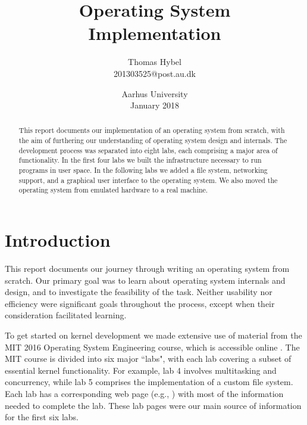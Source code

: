 \documentclass{report}
\begin{document}


\title{Operating System \\ Implementation}
\author{Thomas Hybel \\ \small{201303525@post.au.dk}}
\date{Aarhus University \\ January 2018}
\maketitle


\begin{abstract} 
\noindent 
This report documents our implementation of an operating system from scratch,
with the aim of furthering our understanding of operating system design and
internals. The development process was separated into eight labs, each
comprising a major area of functionality. In the first four labs we built the
infrastructure necessary to run programs in user space. In the following labs
we added a file system, networking support, and a graphical user interface to
the operating system. We also moved the operating system from emulated
hardware to a real machine.
\end{abstract}
\newpage


\tableofcontents

\newpage
{}




\chapter{Introduction}
This report documents our journey through writing an operating system from
scratch. Our primary goal was to learn about operating system internals and
design, and to investigate the feasibility of the task. Neither usability nor
efficiency were significant goals throughout the process, except when
their consideration facilitated learning.

To get started on kernel development we made extensive use of material from
the MIT 2016 Operating System Engineering course, which is
accessible online \cite{mitcourse}. The MIT course is divided into six major
``labs", with each lab covering a subset of essential kernel functionality.
For example, lab 4 involves multitasking and concurrency, while lab 5
comprises the implementation of a custom file system. Each lab has a
corresponding web page (e.g., \cite{lab1}) with most of the
information needed to complete the lab. These lab pages were our main source
of information for the first six labs.
\end{document}
